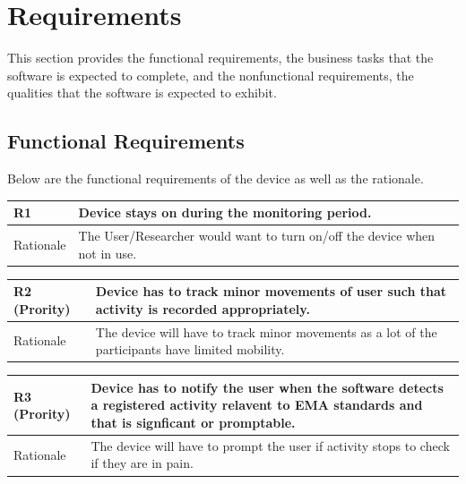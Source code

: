 \documentclass[12pt]{article}
\begin{document}
\section{Requirements}
\label{Requirements}
This section provides the functional requirements, the business tasks that the
software is expected to complete, and the nonfunctional requirements, the
qualities that the software is expected to exhibit.

\subsection{Functional Requirements}
Below are the functional requirements of the device as well as the rationale.


\begin{center}
\begin{tabular}{|l|p{14cm}|}
 \hline
 R1 \label{R1} & Device stays on during the monitoring period. \\ [0.5ex]
 \hline
 Rationale &  The User/Researcher would want to turn on/off the device when not in use.\\ 
 \hline
\end{tabular}
\end{center}
\hspace{0.5cm}
\begin{center}
\begin{tabular}{|l|p{14cm}|}
 \hline
 R2 \label{R2} (Prority) & Device has to track minor movements of user such that activity is recorded appropriately.\\ [0.5ex]
 \hline
 Rationale &  The device will have to track minor movements as a lot of the participants have limited mobility.\\ 
 \hline
\end{tabular}
\end{center}
\hspace{0.5em}
\begin{center}
\begin{tabular}{|l|p{14cm}|}
 \hline
 R3 \label{R3}(Prority) &Device has to notify the user when the software detects a registered activity relavent to EMA standards and that is signficant or promptable.\\ [0.5ex]
 \hline
 Rationale &  The device will have to prompt the user if activity stops to check if they are in pain.\\ 
 \hline
\end{tabular}
\end{center}
\end{document}
